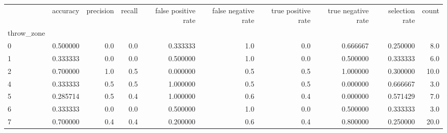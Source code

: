 \begin{tabular}{lrrrrrrrrr}
\toprule
{} &  accuracy &  precision &  recall &  false positive rate &  false negative rate &  true positive rate &  true negative rate &  selection rate &  count \\
throw\_zone &           &            &         &                      &                      &                     &                     &                 &        \\
\midrule
0          &  0.500000 &        0.0 &     0.0 &             0.333333 &                  1.0 &                 0.0 &            0.666667 &        0.250000 &    8.0 \\
1          &  0.333333 &        0.0 &     0.0 &             0.500000 &                  1.0 &                 0.0 &            0.500000 &        0.333333 &    6.0 \\
2          &  0.700000 &        1.0 &     0.5 &             0.000000 &                  0.5 &                 0.5 &            1.000000 &        0.300000 &   10.0 \\
4          &  0.333333 &        0.5 &     0.5 &             1.000000 &                  0.5 &                 0.5 &            0.000000 &        0.666667 &    3.0 \\
5          &  0.285714 &        0.5 &     0.4 &             1.000000 &                  0.6 &                 0.4 &            0.000000 &        0.571429 &    7.0 \\
6          &  0.333333 &        0.0 &     0.0 &             0.500000 &                  1.0 &                 0.0 &            0.500000 &        0.333333 &    3.0 \\
7          &  0.700000 &        0.4 &     0.4 &             0.200000 &                  0.6 &                 0.4 &            0.800000 &        0.250000 &   20.0 \\
\bottomrule
\end{tabular}
